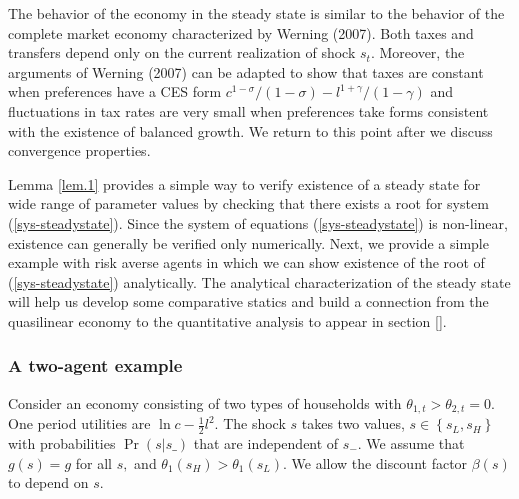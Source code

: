 \documentclass[11.5pt,twoside]{article}
\begin{document}
The behavior of the economy in the steady state is similar to the behavior of the complete market economy characterized by Werning (2007). Both taxes and transfers depend only on the current realization of shock $s_t$. Moreover, the arguments of Werning (2007) can be adapted  to show that taxes are constant when preferences have a CES form $c^{1-\sigma}/(1-\sigma) - l^{1+\gamma}/(1-\gamma) $ and fluctuations in tax rates are very small when preferences take forms consistent with the existence of  balanced growth. We return to this point after we discuss convergence properties.

Lemma \ref{lem.1} provides a simple way to verify existence of a steady state for wide range of parameter values by checking that there exists a root for system (\ref{sys-steadystate}). Since the system of equations (\ref{sys-steadystate}) is non-linear, existence can generally be verified only numerically. Next, we provide a simple example with risk averse agents in which we can show existence of the root of (\ref{sys-steadystate}) analytically. The analytical characterization of the steady state will help us  develop some comparative statics and build a connection from the quasilinear economy to the quantitative analysis to appear in section \ref{}.

\subsubsection{A two-agent example}\label{sec: 2 agent example}


Consider an economy consisting of  two types of households with $%
\theta _{1,t}>\theta _{2,t}=0$. One period utilities are $\ln c-\frac{1}{2}%
l^{2}.$ The shock $s$  takes  two values, $s\in \left\{
s_{L},s_{H}\right\} $ with probabilities $\Pr \left( s|s\_\right) $ that are
independent of $s_{-}.$ We assume that $g\left( s\right) =g$ for all $s,$
and $\theta _{1}\left( s_{H}\right) >\theta _{1}\left( s_{L}\right) .$ We allow the discount factor $\beta(s)$ to depend on  $s.$

\smallskip
\end{document}
